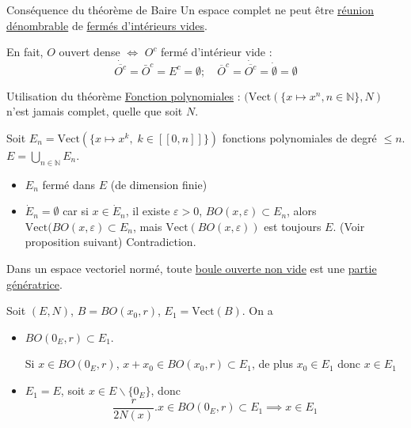 \begin{Prop}{Conséquence du théorème de Baire}{}
Un espace complet ne peut être \underline{réunion dénombrable} de \underline{fermés d'intérieurs vides}.
\end{Prop}
\begin{myproof}{}{}
En fait, $O$ ouvert dense $\iff$ $O ^{c}$ fermé d'intérieur vide :
\[
  \dot{\overline{O ^{c}}} = \bar{O} ^{c} = E ^{c} = \emptyset; \quad \overline{O} ^{c} = \dot{\overline{O ^{c}}} = \dot{\emptyset} = \emptyset
\]
\end{myproof}

\begin{Example}{Utilisation du théorème}{}
  \underline{Fonction polynomiales} : $(\mathrm{Vect}(\{x \mapsto x ^{n}, n \in \mathbb{N}\}, N)$ n'est jamais complet, quelle que soit $N$.
\end{Example}

\begin{myproof}{}{}
  Soit $E_n =\mathrm{Vect}(\{x \mapsto x ^{k},\; k \in [\![0,n]\!]\})$ fonctions polynomiales de degré $\le n$. $E = \bigcup _{n\in \mathbb{N}} E_n$. 
  \begin{itemize}

      \item $E_n$ fermé dans $E$ (de dimension finie)
      \item $\dot E_n = \emptyset$ car si $x \in \dot E_n$, il existe $\varepsilon >0$, $BO(x, \varepsilon) \subset E_n$, alors $\mathrm{Vect}(BO(x,\varepsilon) \subset E_n$, mais $\mathrm{Vect}(BO(x,\varepsilon))$ est toujours $E$. (Voir proposition suivant) Contradiction.
  \end{itemize}
\end{myproof}

\begin{Prop}{}{}
  Dans un espace vectoriel normé, toute \underline{boule ouverte non vide} est une \underline{partie génératrice}. 
\end{Prop}

\begin{myproof}{}{}
Soit $(E,N)$, $B = BO(x_0, r)$, $E_1 = \mathrm{Vect}(B)$. On a 
\begin{itemize}

    \item $BO(0_E, r) \subset E_1$. 

      Si $x \in BO(0_E, r)$, $x + x_0 \in BO(x_0, r) \subset E_1$, de plus $x_0 \in E_1$ donc $x \in E_1$
    \item $E_1 = E$, soit $x \in E \backslash \{0_E\}$, donc 
      \[
        \frac{r}{2N(x)}.x \in BO(0_E, r) \subset E_1 \implies x\in E_1
      \]

\end{itemize}
\end{myproof}






